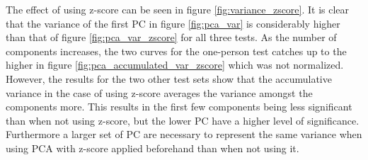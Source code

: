 The effect of using z-score can be seen in figure \ref{fig:variance_zscore}.
It is clear that the variance of the first PC in figure \ref{fig:pca_var} is considerably higher than that of figure \ref{fig:pca_var_zscore} for all three tests.
As the number of components increases, the two curves for the one-person test catches up to the higher in figure \ref{fig:pca_accumulated_var_zscore} which was not normalized.
However, the results for the two other test sets show that the accumulative variance in the case of using z-score averages the variance amongst the components more.
This results in the first few components being less significant than when not using z-score, but the lower PC have a higher level of significance.
Furthermore a larger set of PC are necessary to represent the same variance when using PCA with z-score applied beforehand than when not using it.



